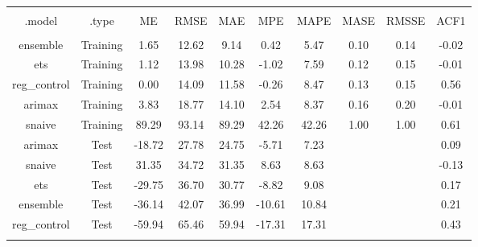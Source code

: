 
\begin{table}[!htbp] \centering 
  \caption{} 
  \label{} 
\begin{tabular}{@{\extracolsep{5pt}} cccccccccc} 
\\[-1.8ex]\hline 
\hline \\[-1.8ex] 
.model & .type & ME & RMSE & MAE & MPE & MAPE & MASE & RMSSE & ACF1 \\ 
\hline \\[-1.8ex] 
ensemble & Training &   1.65 & 12.62 &  9.14 &   0.42 &  5.47 & 0.10 & 0.14 & -0.02 \\ 
ets & Training &   1.12 & 13.98 & 10.28 &  -1.02 &  7.59 & 0.12 & 0.15 & -0.01 \\ 
reg\_control & Training &   0.00 & 14.09 & 11.58 &  -0.26 &  8.47 & 0.13 & 0.15 &  0.56 \\ 
arimax & Training &   3.83 & 18.77 & 14.10 &   2.54 &  8.37 & 0.16 & 0.20 & -0.01 \\ 
snaive & Training &  89.29 & 93.14 & 89.29 &  42.26 & 42.26 & 1.00 & 1.00 &  0.61 \\ 
arimax & Test & -18.72 & 27.78 & 24.75 &  -5.71 &  7.23 &  &  &  0.09 \\ 
snaive & Test &  31.35 & 34.72 & 31.35 &   8.63 &  8.63 &  &  & -0.13 \\ 
ets & Test & -29.75 & 36.70 & 30.77 &  -8.82 &  9.08 &  &  &  0.17 \\ 
ensemble & Test & -36.14 & 42.07 & 36.99 & -10.61 & 10.84 &  &  &  0.21 \\ 
reg\_control & Test & -59.94 & 65.46 & 59.94 & -17.31 & 17.31 &  &  &  0.43 \\ 
\hline \\[-1.8ex] 
\end{tabular} 
\end{table} 
